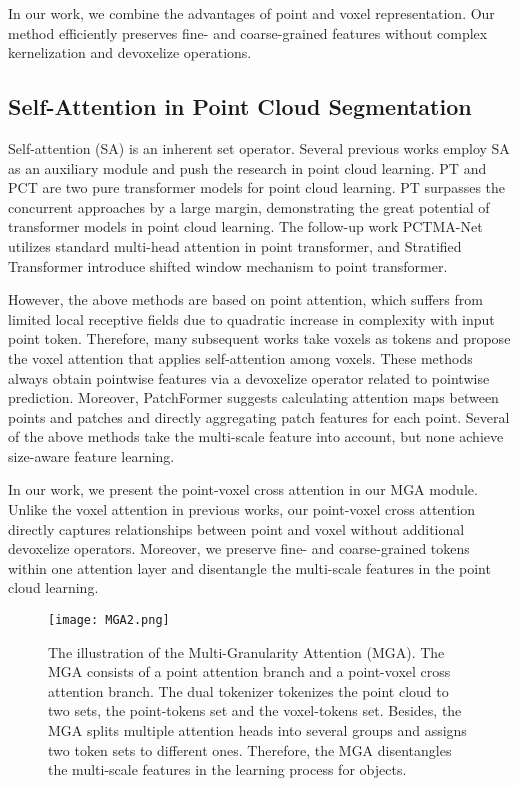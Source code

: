\documentclass[10pt,twocolumn,letterpaper]{article}
\begin{document}
In our work, we combine the advantages of point and voxel representation. Our method efficiently preserves fine- and coarse-grained features without complex kernelization and devoxelize operations.



\subsection{Self-Attention in Point Cloud Segmentation}
Self-attention (SA) is an inherent set operator. Several previous works\cite{pointasnl,randlanet,pointgmm2020} employ SA as an auxiliary module and push the research in point cloud learning. PT\cite{pt2021} and PCT\cite{pct2021} are two pure transformer models for point cloud learning. PT\cite{pt2021} surpasses the concurrent approaches by a large margin, demonstrating the great potential of transformer models in point cloud learning. The follow-up work PCTMA-Net\cite{pctma2021} utilizes standard multi-head attention in point transformer, and Stratified Transformer\cite{strTransformer} introduce shifted window mechanism to point transformer.

However, the above methods are based on point attention, which suffers from limited local receptive fields due to quadratic increase in complexity with input point token. Therefore, many subsequent works\cite{pvt2021,svt2022,patchformer2022,vvattnseg2021,voxeldetr2021, voxeldetr2022} take voxels as tokens and propose the voxel attention that applies self-attention among voxels. These methods always obtain pointwise features via a devoxelize operator related to pointwise prediction. Moreover, PatchFormer\cite{patchformer2022} suggests calculating attention maps between points and patches and directly aggregating patch features for each point. Several of the above methods take the multi-scale feature into account, but none achieve size-aware feature learning.

In our work, we present the point-voxel cross attention in our MGA module. Unlike the voxel attention in previous works, our point-voxel cross attention directly captures relationships between point and voxel without additional devoxelize operators. Moreover, we preserve fine- and coarse-grained tokens within one attention layer and disentangle the multi-scale features in the point cloud learning.






\begin{figure*}
\centering
\texttt{[image: MGA2.png]}
\caption{The illustration of the Multi-Granularity Attention (MGA). The MGA consists of a point attention branch and a point-voxel cross attention branch. The dual tokenizer tokenizes the point cloud to two sets, the point-tokens set and the voxel-tokens set. Besides, the MGA splits multiple attention heads into several groups and assigns two token sets to different ones. Therefore, the MGA disentangles the multi-scale features in the learning process for objects.}
\label{fig_MGA}
\end{figure*}
\end{document}
